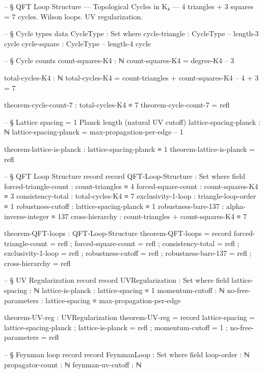 \documentclass[11pt,a4paper]{book}
\begin{document}
\begin{code}
-- § QFT Loop Structure — Topological Cycles in K₄ — 4 triangles + 3 squares = 7 cycles. Wilson loops. UV regularization.

-- § Cycle types
data CycleType : Set where
  cycle-triangle : CycleType   -- length-3 cycle
  cycle-square   : CycleType   -- length-4 cycle

-- § Cycle counts
count-squares-K4 : ℕ
count-squares-K4 = degree-K4  -- 3

total-cycles-K4 : ℕ
total-cycles-K4 = count-triangles + count-squares-K4  -- 4 + 3 = 7

theorem-cycle-count-7 : total-cycles-K4 ≡ 7
theorem-cycle-count-7 = refl

-- § Lattice spacing = 1 Planck length (natural UV cutoff)
lattice-spacing-planck : ℕ
lattice-spacing-planck = max-propagation-per-edge  -- 1

theorem-lattice-is-planck : lattice-spacing-planck ≡ 1
theorem-lattice-is-planck = refl

-- § QFT Loop Structure record
record QFT-Loop-Structure : Set where
  field
    forced-triangle-count   : count-triangles ≡ 4
    forced-square-count     : count-squares-K4 ≡ 3
    consistency-total       : total-cycles-K4 ≡ 7
    exclusivity-1-loop      : triangle-loop-order ≡ 1
    robustness-cutoff       : lattice-spacing-planck ≡ 1
    robustness-bare-137     : alpha-inverse-integer ≡ 137
    cross-hierarchy         : count-triangles + count-squares-K4 ≡ 7

theorem-QFT-loops : QFT-Loop-Structure
theorem-QFT-loops = record
  { forced-triangle-count = refl
  ; forced-square-count   = refl
  ; consistency-total     = refl
  ; exclusivity-1-loop    = refl
  ; robustness-cutoff     = refl
  ; robustness-bare-137   = refl
  ; cross-hierarchy       = refl }

-- § UV Regularization record
record UVRegularization : Set where
  field
    lattice-spacing    : ℕ
    lattice-is-planck  : lattice-spacing ≡ 1
    momentum-cutoff    : ℕ
    no-free-parameters : lattice-spacing ≡ max-propagation-per-edge

theorem-UV-reg : UVRegularization
theorem-UV-reg = record
  { lattice-spacing   = lattice-spacing-planck
  ; lattice-is-planck = refl
  ; momentum-cutoff   = 1
  ; no-free-parameters = refl }

-- § Feynman loop record
record FeynmanLoop : Set where
  field
    loop-order        : ℕ
    propagator-count  : ℕ
    feynman-uv-cutoff : ℕ


\end{code}
\end{document}
